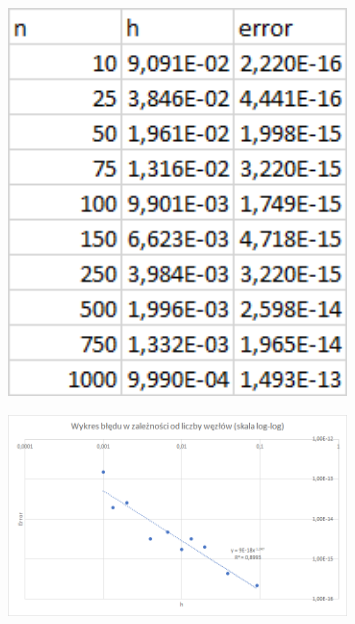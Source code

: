 \begin{figure}[!ht]
	\begin{center}
		\includegraphics[width=0.8\textwidth]{Lab3/charts/zad2/error_dane.png}
	\end{center}
\end{figure}

\begin{figure}[!ht]
	\begin{center}
		\includegraphics[width=0.8\textwidth]{Lab3/charts/zad2/error.png}
	\end{center}
\end{figure}

